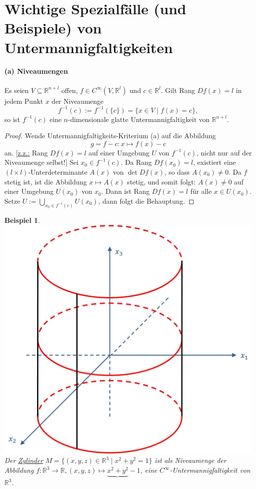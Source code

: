 \documentclass[a4paper,11pt,notitlepage]{report}
\newtheorem{example}{Beispiel}[chapter]
\newcommand{\R}{{\ensuremath{\mathbb{R}}}}
\begin{document}
\section{Wichtige Spezialfälle (und Beispiele) von Untermannigfaltigkeiten}
\paragraph{(a) Niveaumengen}
Es seien $V \subseteq \R^{n+l}$ offen, $f \in C^\infty(V,\R^l)$ und $c \in \R^l$. Gilt Rang $Df(x)=l$ in jedem Punkt $x$ der Niveaumenge
$$f^{-1}(c) := f^{-1}(\{c\}) = \{x \in V \mid f(x) = c\},$$
so ist $f^{-1}(c)$ eine $n$-dimensionale glatte Untermannigfaltigkeit von $\R^{n+l}$.

\begin{proof}
	Wende Untermannigfaltigkeits-Kriterium (a) auf die Abbildung $$g = f - c \colon x \mapsto f(x)-c$$ an.
	\newline
	$[$\underline{z.z.:} Rang $Df(x)=l$ auf einer Umgebung $U$ von $f^{-1}(c)$, nicht nur auf der Niveaumenge selbst!$]$
	\newline
	Sei $x_0 \in f^{-1}(c)$. Da Rang $Df(x_0) = l$, existiert eine $(l \times l)$-Unterdeterminante $A(x)$ von $\det{Df(x)}$, so dass $A(x_0)\neq 0$. Da $f$ stetig ist, ist die Abbildung $x \mapsto A(x)$ stetig, und somit folgt: $A(x)\neq 0$ auf einer Umgebung $U(x_0)$ von $x_0$. Dann ist Rang $Df(x)=l$ für alle $x \in U(x_0)$.
	\newline
	Setze $U:= \bigcup\limits_{x_0 \in f^{-1}(c)}{U(x_0)}$, dann folgt die Behauptung.
\end{proof}

\begin{example}
	\includegraphics[scale=0.4]{images/Zylinder.jpg}
	\newline
	Der \underline{Zylinder} $M=\{(x,y,z) \in \R^3 \mid x^2+y^2 = 1\}$ ist als Niveaumenge der Abbildung $f \colon \R^3 \rightarrow \R, (x,y,z) \mapsto \underbrace{x^2+y^2}-1$, eine $C^\infty$-Untermannigfaltigkeit von $\R^3$.
\end{example}
\end{document}
